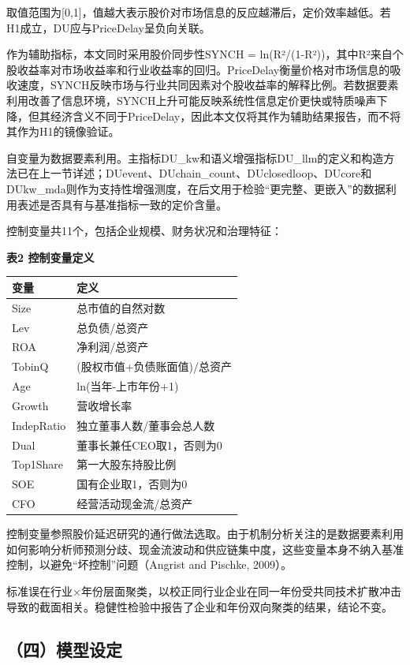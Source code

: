 取值范围为{[}0,1{]}，值越大表示股价对市场信息的反应越滞后，定价效率越低。若H1成立，DU应与PriceDelay呈负向关联。

作为辅助指标，本文同时采用股价同步性SYNCH = ln(R²/(1-R²))，其中R²来自个股收益率对市场收益率和行业收益率的回归。PriceDelay衡量价格对市场信息的吸收速度，SYNCH反映市场与行业共同因素对个股收益率的解释比例。若数据要素利用改善了信息环境，SYNCH上升可能反映系统性信息定价更快或特质噪声下降，但其经济含义不同于PriceDelay，因此本文仅将其作为辅助结果报告，而不将其作为H1的镜像验证。

自变量为数据要素利用。主指标DU\_kw和语义增强指标DU\_llm的定义和构造方法已在上一节详述；DUevent、DUchain\_count、DUclosedloop、DUcore和DUkw\_mda则作为支持性增强测度，在后文用于检验``更完整、更嵌入''的数据利用表述是否具有与基准指标一致的定价含量。

控制变量共11个，包括企业规模、财务状况和治理特征：

\textbf{表2 控制变量定义}

{\def\LTcaptype{} %
\begin{longtable}[]{@{}ll@{}}
\toprule\noalign{}
变量 & 定义 \\
\midrule\noalign{}
\endhead
\bottomrule\noalign{}
\endlastfoot
Size & 总市值的自然对数 \\
Lev & 总负债/总资产 \\
ROA & 净利润/总资产 \\
TobinQ & (股权市值+负债账面值)/总资产 \\
Age & ln(当年-上市年份+1) \\
Growth & 营收增长率 \\
IndepRatio & 独立董事人数/董事会总人数 \\
Dual & 董事长兼任CEO取1，否则为0 \\
Top1Share & 第一大股东持股比例 \\
SOE & 国有企业取1，否则为0 \\
CFO & 经营活动现金流/总资产 \\
\end{longtable}
}

控制变量参照股价延迟研究的通行做法选取。由于机制分析关注的是数据要素利用如何影响分析师预测分歧、现金流波动和供应链集中度，这些变量本身不纳入基准控制，以避免``坏控制''问题（Angrist and Pischke, 2009）。

标准误在行业×年份层面聚类，以校正同行业企业在同一年份受共同技术扩散冲击导致的截面相关。稳健性检验中报告了企业和年份双向聚类的结果，结论不变。

\subsection{（四）模型设定}\label{ux56dbux6a21ux578bux8bbeux5b9a}

